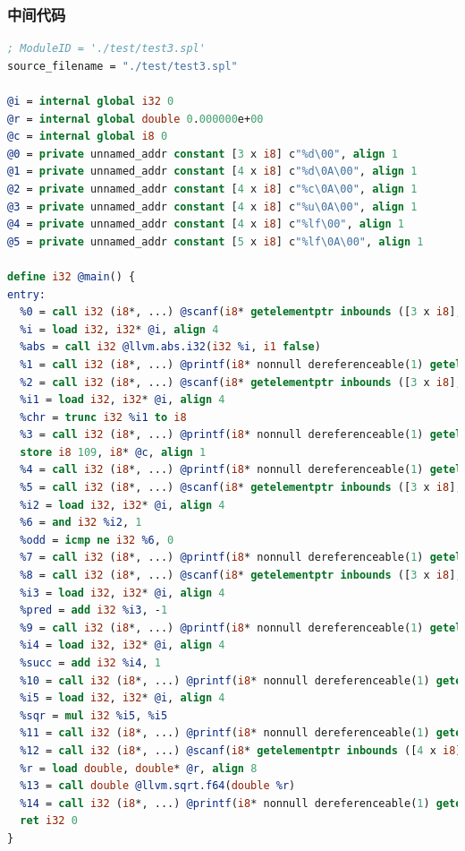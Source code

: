 \documentclass{article}
\begin{document}
\subsubsection{中间代码}
\begin{lstlisting}[language=LLVM]
; ModuleID = './test/test3.spl'
source_filename = "./test/test3.spl"

@i = internal global i32 0
@r = internal global double 0.000000e+00
@c = internal global i8 0
@0 = private unnamed_addr constant [3 x i8] c"%d\00", align 1
@1 = private unnamed_addr constant [4 x i8] c"%d\0A\00", align 1
@2 = private unnamed_addr constant [4 x i8] c"%c\0A\00", align 1
@3 = private unnamed_addr constant [4 x i8] c"%u\0A\00", align 1
@4 = private unnamed_addr constant [4 x i8] c"%lf\00", align 1
@5 = private unnamed_addr constant [5 x i8] c"%lf\0A\00", align 1

define i32 @main() {
entry:
  %0 = call i32 (i8*, ...) @scanf(i8* getelementptr inbounds ([3 x i8], [3 x i8]* @0, i64 0, i64 0), i32* nonnull @i)
  %i = load i32, i32* @i, align 4
  %abs = call i32 @llvm.abs.i32(i32 %i, i1 false)
  %1 = call i32 (i8*, ...) @printf(i8* nonnull dereferenceable(1) getelementptr inbounds ([4 x i8], [4 x i8]* @1, i64 0, i64 0), i32 %abs)
  %2 = call i32 (i8*, ...) @scanf(i8* getelementptr inbounds ([3 x i8], [3 x i8]* @0, i64 0, i64 0), i32* nonnull @i)
  %i1 = load i32, i32* @i, align 4
  %chr = trunc i32 %i1 to i8
  %3 = call i32 (i8*, ...) @printf(i8* nonnull dereferenceable(1) getelementptr inbounds ([4 x i8], [4 x i8]* @2, i64 0, i64 0), i8 %chr)
  store i8 109, i8* @c, align 1
  %4 = call i32 (i8*, ...) @printf(i8* nonnull dereferenceable(1) getelementptr inbounds ([4 x i8], [4 x i8]* @1, i64 0, i64 0), i32 109)
  %5 = call i32 (i8*, ...) @scanf(i8* getelementptr inbounds ([3 x i8], [3 x i8]* @0, i64 0, i64 0), i32* nonnull @i)
  %i2 = load i32, i32* @i, align 4
  %6 = and i32 %i2, 1
  %odd = icmp ne i32 %6, 0
  %7 = call i32 (i8*, ...) @printf(i8* nonnull dereferenceable(1) getelementptr inbounds ([4 x i8], [4 x i8]* @3, i64 0, i64 0), i1 %odd)
  %8 = call i32 (i8*, ...) @scanf(i8* getelementptr inbounds ([3 x i8], [3 x i8]* @0, i64 0, i64 0), i32* nonnull @i)
  %i3 = load i32, i32* @i, align 4
  %pred = add i32 %i3, -1
  %9 = call i32 (i8*, ...) @printf(i8* nonnull dereferenceable(1) getelementptr inbounds ([4 x i8], [4 x i8]* @1, i64 0, i64 0), i32 %pred)
  %i4 = load i32, i32* @i, align 4
  %succ = add i32 %i4, 1
  %10 = call i32 (i8*, ...) @printf(i8* nonnull dereferenceable(1) getelementptr inbounds ([4 x i8], [4 x i8]* @1, i64 0, i64 0), i32 %succ)
  %i5 = load i32, i32* @i, align 4
  %sqr = mul i32 %i5, %i5
  %11 = call i32 (i8*, ...) @printf(i8* nonnull dereferenceable(1) getelementptr inbounds ([4 x i8], [4 x i8]* @1, i64 0, i64 0), i32 %sqr)
  %12 = call i32 (i8*, ...) @scanf(i8* getelementptr inbounds ([4 x i8], [4 x i8]* @4, i64 0, i64 0), double* nonnull @r)
  %r = load double, double* @r, align 8
  %13 = call double @llvm.sqrt.f64(double %r)
  %14 = call i32 (i8*, ...) @printf(i8* nonnull dereferenceable(1) getelementptr inbounds ([5 x i8], [5 x i8]* @5, i64 0, i64 0), double %13)
  ret i32 0
}


\end{lstlisting}
\end{document}
